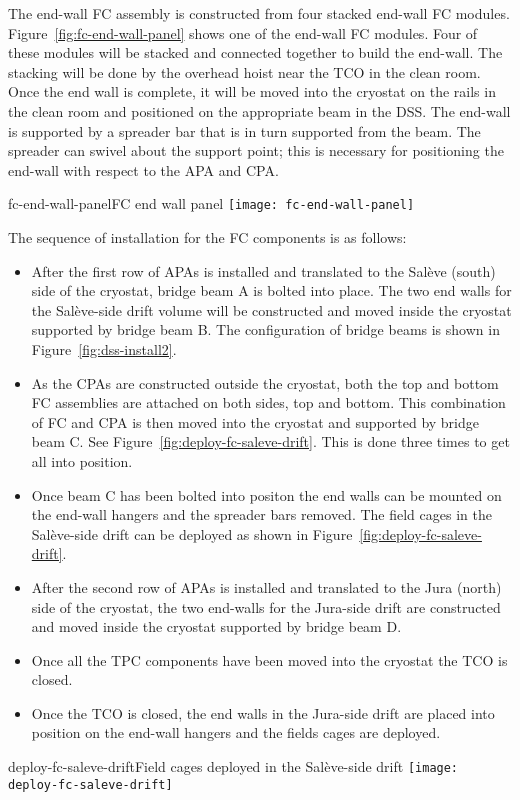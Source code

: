 The end-wall FC assembly is constructed from four stacked end-wall FC modules.  Figure~\ref{fig:fc-end-wall-panel} shows one of the end-wall FC modules.  Four of these modules will be stacked and connected together to build the end-wall.  
The stacking will be done by the overhead hoist near the TCO in the clean room.  Once the end wall is complete, it will be moved into the cryostat on the rails in the clean room and positioned on the appropriate beam in the DSS. 
The end-wall is supported by a spreader bar that is in turn supported from the beam. The spreader can swivel about the support point;  this is necessary for positioning the end-wall with respect to the APA and CPA.  

\begin{cdrfigure}{fc-end-wall-panel}{FC end wall panel }
\texttt{[image: fc-end-wall-panel]}
\end{cdrfigure}

The sequence of installation for the FC components is as follows:
\begin{itemize}
\item After the first row of APAs is installed and translated to the Sal\`{e}ve (south) side of the cryostat, bridge beam A is bolted into place. The two end walls for the Sal\`{e}ve-side drift volume will be constructed and moved inside the cryostat supported 
by bridge beam B. The configuration of bridge beams is shown in Figure~\ref{fig:dss-install2}.
\item As the CPAs are constructed outside the cryostat, both the top and bottom FC assemblies are attached on both sides, top and bottom.  This combination of FC and CPA is then moved into the cryostat and supported by bridge beam C. See Figure~\ref{fig:deploy-fc-saleve-drift}.
This is done three times to get all into position.
\item Once beam C  has been bolted into positon the end walls can be mounted on the end-wall hangers and the spreader bars removed.  The field cages in the Sal\`{e}ve-side drift can be deployed as shown in Figure~\ref{fig:deploy-fc-saleve-drift}.
\item After the second row of APAs is installed and translated to the Jura (north) side of the cryostat, the two end-walls for the Jura-side drift are constructed and moved inside the cryostat supported by bridge beam D. 
\item Once all the TPC components have been moved into the cryostat the TCO is closed.
\item Once the TCO is closed, the end walls in the Jura-side drift are placed into position on the end-wall hangers and the fields cages are deployed.
\end{itemize}
\begin{cdrfigure}{deploy-fc-saleve-drift}{Field cages deployed in the Sal\`{e}ve-side drift}
\texttt{[image: deploy-fc-saleve-drift]}
\end{cdrfigure}
